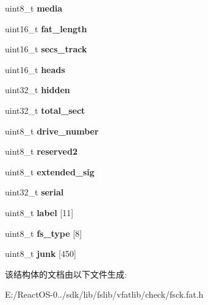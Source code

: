 \begin{DoxyCompactItemize}
uint8\+\_\+t {\bfseries media}
\item 
\mbox{\label{structboot__sector__16_a2798e789c2d2690d3116b1fd7389ab96}} 
uint16\+\_\+t {\bfseries fat\+\_\+length}
\item 
\mbox{\label{structboot__sector__16_abab46365f757919d7e69a34c7c5d2dbe}} 
uint16\+\_\+t {\bfseries secs\+\_\+track}
\item 
\mbox{\label{structboot__sector__16_a9aa79fc0bb3c949d2b7e541142aad004}} 
uint16\+\_\+t {\bfseries heads}
\item 
\mbox{\label{structboot__sector__16_a5c9fddcbd4c26b3b77c57c2c36317ebd}} 
uint32\+\_\+t {\bfseries hidden}
\item 
\mbox{\label{structboot__sector__16_a636d8dc517410db3e3e484975d269610}} 
uint32\+\_\+t {\bfseries total\+\_\+sect}
\item 
\mbox{\label{structboot__sector__16_a1559e3e5f4ccbef729033bc0e2bf4020}} 
uint8\+\_\+t {\bfseries drive\+\_\+number}
\item 
\mbox{\label{structboot__sector__16_aece1d5f8e2a4ce09b2a3ce08d63c3d35}} 
uint8\+\_\+t {\bfseries reserved2}
\item 
\mbox{\label{structboot__sector__16_a672c573beaaa3178fb8776caebe1cfc4}} 
uint8\+\_\+t {\bfseries extended\+\_\+sig}
\item 
\mbox{\label{structboot__sector__16_ae28ab66803736f6fc88524327f0be541}} 
uint32\+\_\+t {\bfseries serial}
\item 
\mbox{\label{structboot__sector__16_ad9b6f65069a8cd30f8344b41c6ef2ce0}} 
uint8\+\_\+t {\bfseries label} \mbox{[}11\mbox{]}
\item 
\mbox{\label{structboot__sector__16_a663779409d6f8117fd548e28d551de93}} 
uint8\+\_\+t {\bfseries fs\+\_\+type} \mbox{[}8\mbox{]}
\item 
\mbox{\label{structboot__sector__16_a236deafee1d496da01f7ed763f3734dd}} 
uint8\+\_\+t {\bfseries junk} \mbox{[}450\mbox{]}
\end{DoxyCompactItemize}


该结构体的文档由以下文件生成\+:\begin{DoxyCompactItemize}
\item 
E\+:/\+React\+O\+S-\/0../sdk/lib/fslib/vfatlib/check/fsck.\+fat.\+h\end{DoxyCompactItemize}
